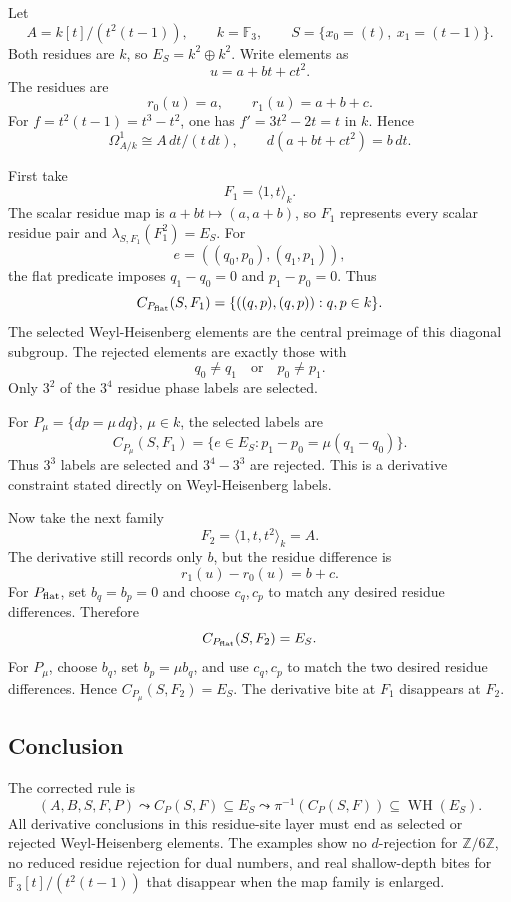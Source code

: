 Let
\[
  A=k[t]/(t^2(t-1)),\qquad k=\mathbb F_3,\qquad
  S=\{x_0=(t),\ x_1=(t-1)\}.
\]
Both residues are \(k\), so \(E_S=k^2\oplus k^2\).  Write elements as
\[
  u=a+bt+ct^2.
\]
The residues are
\[
  r_0(u)=a,\qquad r_1(u)=a+b+c.
\]
For \(f=t^2(t-1)=t^3-t^2\), one has \(f'=3t^2-2t=t\) in \(k\).  Hence
\[
  \Omega^1_{A/k}\cong A\,dt/(t\,dt),\qquad
  d(a+bt+ct^2)=b\,dt.
\]

First take
\[
  F_1=\langle1,t\rangle_k.
\]
The scalar residue map is \(a+bt\mapsto(a,a+b)\), so \(F_1\) represents every
scalar residue pair and \(\lambda_{S,F_1}(F_1^2)=E_S\).  For
\[
  e=((q_0,p_0),(q_1,p_1)),
\]
the flat predicate imposes \(q_1-q_0=0\) and \(p_1-p_0=0\).  Thus
\[
  C_{P_{\rm flat}}(S,F_1)=\{((q,p),(q,p)):q,p\in k\}.
\]
The selected Weyl-Heisenberg elements are the central preimage of this
diagonal subgroup.  The rejected elements are exactly those with
\[
  q_0\ne q_1\quad\text{or}\quad p_0\ne p_1.
\]
Only \(3^2\) of the \(3^4\) residue phase labels are selected.

For \(P_\mu=\{dp=\mu\,dq\}\), \(\mu\in k\), the selected labels are
\[
  C_{P_\mu}(S,F_1)
  =
  \{e\in E_S:p_1-p_0=\mu(q_1-q_0)\}.
\]
Thus \(3^3\) labels are selected and \(3^4-3^3\) are rejected.  This is a
derivative constraint stated directly on Weyl-Heisenberg labels.

Now take the next family
\[
  F_2=\langle1,t,t^2\rangle_k=A.
\]
The derivative still records only \(b\), but the residue difference is
\[
  r_1(u)-r_0(u)=b+c.
\]
For \(P_{\rm flat}\), set \(b_q=b_p=0\) and choose \(c_q,c_p\) to match any
desired residue differences.  Therefore
\[
  C_{P_{\rm flat}}(S,F_2)=E_S.
\]
For \(P_\mu\), choose \(b_q\), set \(b_p=\mu b_q\), and use \(c_q,c_p\) to
match the two desired residue differences.  Hence \(C_{P_\mu}(S,F_2)=E_S\).
The derivative bite at \(F_1\) disappears at \(F_2\).

\subsection{Conclusion}

The corrected rule is
\[
  (A,B,S,F,P)\leadsto C_P(S,F)\subseteq E_S
  \leadsto \pi^{-1}(C_P(S,F))\subseteq\operatorname{WH}(E_S).
\]
All derivative conclusions in this residue-site layer must end as selected or
rejected Weyl-Heisenberg elements.  The examples show no \(d\)-rejection for
\(\mathbb Z/6\mathbb Z\), no reduced residue rejection for dual numbers, and
real shallow-depth bites for \(\mathbb F_3[t]/(t^2(t-1))\) that disappear when
the map family is enlarged.
